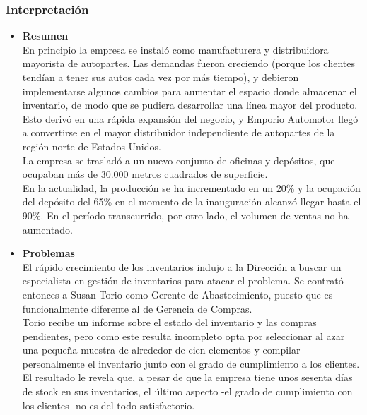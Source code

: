 \documentclass[a4paper,10pt,titlepage]{article}
\begin{document}
\subsubsection {Interpretaci\'on}
\begin{itemize}
 \item \textbf{Resumen}\\

En principio la empresa se instal\'o como manufacturera y distribuidora mayorista de autopartes. Las demandas fueron creciendo (porque los clientes tend\'ian a tener 
sus autos cada vez por m\'as tiempo), y debieron implementarse algunos cambios para aumentar el espacio donde almacenar el inventario, de modo que se pudiera 
desarrollar una l\'inea mayor del producto. Esto deriv\'o en una r\'apida expansi\'on del negocio, y Emporio Automotor lleg\'o a convertirse en el mayor distribuidor 
independiente de autopartes de la regi\'on norte de Estados Unidos.\\

La empresa se traslad\'o a un nuevo conjunto de oficinas y dep\'ositos, que ocupaban más de 30.000 metros cuadrados de superficie.\\

En la actualidad, la producción se ha incrementado en un 20\% y la ocupaci\'on del depósito del 65\% en el momento de la inauguración alcanz\'o llegar hasta el 90\%. 
En el per\'iodo transcurrido, por otro lado, el volumen de ventas no ha aumentado.\\


\item \textbf{Problemas}\\

El r\'apido crecimiento de los inventarios indujo a la Direcci\'on a buscar un especialista en gesti\'on de inventarios para atacar el problema. Se contrat\'o entonces a 
Susan Torio como Gerente de Abastecimiento, puesto que es funcionalmente diferente al de Gerencia de Compras.\\

Torio recibe un informe sobre el estado del inventario y las compras pendientes, pero como este resulta incompleto opta por seleccionar al azar una pequeña muestra 
de alrededor de cien elementos y compilar personalmente el inventario junto con el grado de cumplimiento a los clientes. El resultado le revela que, a pesar de que la 
empresa tiene unos sesenta d\'ias de stock en sus inventarios, el último aspecto -el grado de cumplimiento con los clientes- no es del todo satisfactorio.\\

\end{itemize}
\newpage
\end{document}

